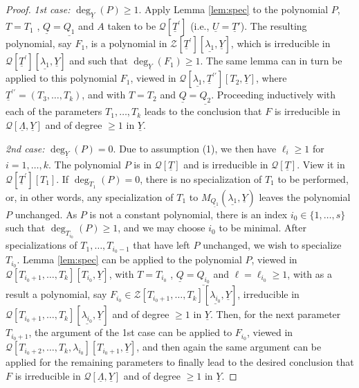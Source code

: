 \documentclass[11pt,a4paper,reqno]{amsart}
\theoremstyle{definition}
\begin{document}
\begin{proof}
\noindent
{\it 1st case:} $\deg_{\underline Y}(P) \geq 1$.
Apply Lemma \ref{lem:spec} to the polynomial $P$, $T=T_1$ , $\underline Q=\underline{Q_1}$ and $A$ taken to be ${\mathcal Q}[{\underline T}^\prime]$ (i.e., $\underline{U}=\underline{T}'$).
The resulting polynomial, say $F_1$, is a polynomial in ${\mathcal Z}[{\underline T}^\prime][{\underline{\lambda_1}}, {\underline Y}]$, which is irreducible in ${\mathcal Q}[{\underline T}^\prime][ {\underline{\lambda_1}},{\underline Y}]$ and such that $\deg_{{\underline Y}}(F_1) \geq 1$. The same lemma can in turn be applied to this polynomial $F_1$, viewed in ${\mathcal Q}[{\underline{\lambda_1}},{\underline T}^{\prime\prime}][T_2,{\underline Y}]$, where ${\underline T}^{\prime\prime}=(T_3,\ldots,T_k)$, and with $T=T_2$ and $\underline Q=\underline{Q_2}$. Proceeding inductively with each of the parameters $T_1,\ldots,T_k$ leads to the conclusion that $F$ is irreducible in ${\mathcal Q}[\underline{\Lambda},\underline Y]$ and of degree $\geq 1$ in $\underline Y$.

\vskip 1mm
\noindent
{\it 2nd case:} $\deg_{\underline Y}(P)=0$. Due to assumption (1), we then have $\ell_i \geq 1$ for $i=1,\ldots,k$. The polynomial $P$ is in ${\mathcal Q}[\underline T]$ and is irreducible in ${\mathcal Q}[\underline T]$. View it in ${\mathcal Q}[{\underline T}^\prime][T_1]$. If $\deg_{T_1}(P) = 0$, there is no specialization of $T_1$ to be performed, or, in other words, any specialization of $T_1$ to  $M_{\underline {Q_1}}({\underline{\lambda_1}},\underline Y)$ leaves the polynomial $P$ unchanged. As $P$ is not a constant polynomial, there is an index $i_0\in \{1,\ldots,s\}$ such that $\deg_{T_{i_0}}(P)\geq 1$, and we may choose $i_0$ to be minimal. After specializations of $T_1,\ldots,T_{i_0-1}$ that have left $P$ unchanged, we wish to specialize $T_{i_0}$. Lemma \ref{lem:spec} can be applied to the polynomial $P$, viewed in ${\mathcal Q}[T_{i_0+1},\ldots,T_k] [T_{i_0},\underline Y]$, with $T=T_{i_0}$ , $\underline Q=\underline{Q_{i_0}}$ and $\ell=\ell_{i_0}\geq 1$, with as a result a polynomial, say $F_{i_0} \in {\mathcal Z}[T_{i_0+1},\ldots,T_k] [\underline{\lambda_{i_0}},\underline Y]$, irreducible in ${\mathcal Q}[T_{i_0+1},\ldots,T_k] [\underline{\lambda_{i_0}},\underline Y]$ and of degree $\geq 1$ in $\underline Y$. Then, for the next parameter $T_{i_0+1}$, the argument of the 1st case can be applied to $F_{i_0}$, 
viewed in ${\mathcal Q}[T_{i_0+2},\ldots,T_k,\lambda_{i_0}] [{T_{i_0+1}},\underline Y]$, and then again the same argument can be applied for the remaining parameters to finally lead to the desired conclusion that $F$ is irreducible in ${\mathcal Q}[\underline{\Lambda},\underline Y]$ and of degree $\geq 1$ in $\underline Y$.
\end{proof}
\end{document}
